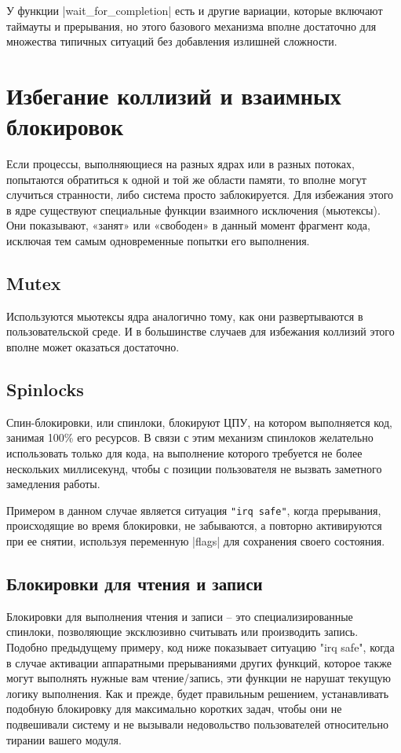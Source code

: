 \documentclass[10pt, oneside]{book}
\begin{document}
У функции \cpp|wait_for_completion| есть и другие вариации, которые включают таймауты и прерывания, но этого базового механизма вполне достаточно для множества типичных ситуаций без добавления излишней сложности.


\section{Избегание коллизий и взаимных блокировок}
\label{sec:synchronization}
Если процессы, выполняющиеся на разных ядрах или в разных потоках, попытаются обратиться к одной и той же области памяти, то вполне могут случиться странности, либо система просто заблокируется.
Для избежания этого в ядре существуют специальные функции взаимного исключения (мьютексы).
Они показывают, «занят» или «свободен» в данный момент фрагмент кода, исключая тем самым одновременные попытки его выполнения.
\subsection{Mutex}
\label{sec:mutex}
Используются мьютексы ядра аналогично тому, как они развертываются в пользовательской среде.
И в большинстве случаев для избежания коллизий этого вполне может оказаться достаточно.


\subsection{Spinlocks}
\label{sec:spinlock}
Спин-блокировки, или спинлоки, блокируют ЦПУ, на котором выполняется код, занимая 100\% его ресурсов. В связи с этим механизм спинлоков желательно использовать только для кода, на выполнение которого требуется не более нескольких миллисекунд, чтобы с позиции пользователя не вызвать заметного замедления работы.

Примером в данном случае является ситуация \verb|"irq safe"|, когда прерывания, происходящие во время блокировки, не забываются, а повторно активируются при ее снятии, используя переменную \cpp|flags| для сохранения своего состояния.


\subsection{Блокировки для чтения и записи}
\label{sec:rwlock}
Блокировки для выполнения чтения и записи – это специализированные спинлоки, позволяющие эксклюзивно считывать или производить запись.
Подобно предыдущему примеру, код ниже показывает ситуацию "irq safe", когда в случае активации аппаратными прерываниями других функций, которое также могут выполнять нужные вам чтение/запись, эти функции не нарушат текущую логику выполнения.
Как и прежде, будет правильным решением, устанавливать подобную блокировку для максимально коротких задач, чтобы они не подвешивали систему и не вызывали
недовольство пользователей относительно тирании вашего модуля.
\end{document}
